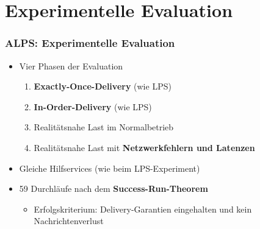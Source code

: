 \documentclass[11pt,aspectratio=1610]{beamer} %
\begin{document}
\section{Experimentelle Evaluation}

\makesectionpage

\begin{frame}
    \frametitle{ALPS: Experimentelle Evaluation}

    \begin{itemize}
        \item Vier Phasen der Evaluation
              \begin{enumerate}
                  \item \textbf{Exactly-Once-Delivery} (wie LPS)
                  \item \textbf{In-Order-Delivery} (wie LPS)
                  \item Realitätsnahe Last im Normalbetrieb
                  \item Realitätsnahe Last mit \textbf{Netzwerkfehlern und Latenzen}
              \end{enumerate}
        \item Gleiche Hilfservices (wie beim LPS-Experiment)
        \item 59 Durchläufe nach dem \textbf{Success-Run-Theorem}
              \begin{itemize}
                  \item Erfolgskriterium: Delivery-Garantien eingehalten und kein Nachrichtenverlust
              \end{itemize}
    \end{itemize}
\end{frame}
\end{document}

